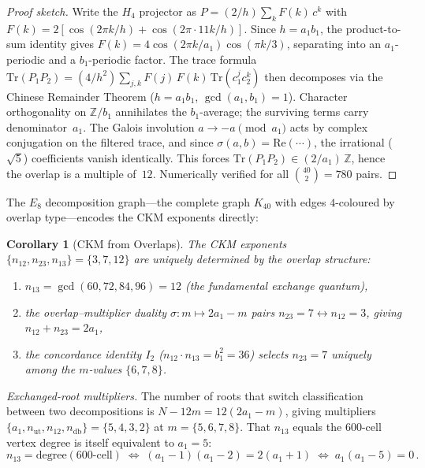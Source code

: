 \documentclass[12pt,a4paper]{article}
\newtheorem{corollary}{Corollary}
\theoremstyle{definition}
\begin{document}
\begin{proof}[Proof sketch]
Write the $H_4$ projector as $P = (2/h)\sum_k F(k)\,c^k$ with $F(k) = 2[\cos(2\pi k/h) + \cos(2\pi\cdot 11k/h)]$.  Since $h = a_1 b_1$, the product-to-sum identity gives $F(k) = 4\cos(2\pi k/a_1)\cos(\pi k/3)$, separating into an $a_1$-periodic and a $b_1$-periodic factor.  The trace formula $\mathrm{Tr}(P_1 P_2) = (4/h^2)\sum_{j,k} F(j)\,F(k)\,\mathrm{Tr}(c_1^j c_2^k)$ then decomposes via the Chinese Remainder Theorem ($h = a_1 b_1$, $\gcd(a_1,b_1) = 1$).  Character orthogonality on $\mathbb{Z}/b_1$ annihilates the $b_1$-average; the surviving terms carry denominator~$a_1$.  The Galois involution $a \to -a\!\pmod{a_1}$ acts by complex conjugation on the filtered trace, and since $\sigma(a,b) = \mathrm{Re}(\cdots)$, the irrational ($\sqrt{5}$) coefficients vanish identically.  This forces $\mathrm{Tr}(P_1 P_2) \in (2/a_1)\,\mathbb{Z}$, hence the overlap is a multiple of~$12$.  Numerically verified for all $\binom{40}{2} = 780$ pairs.
\end{proof}

\noindent The $E_8$ decomposition graph---the complete graph $K_{40}$ with edges $4$-coloured by overlap type---encodes the CKM exponents directly:

\begin{corollary}[CKM from Overlaps]
\label{cor:ckm_overlap}
The CKM exponents $\{n_{12}, n_{23}, n_{13}\} = \{3, 7, 12\}$ are uniquely determined by the overlap structure:
\begin{enumerate}
\item $n_{13} = \gcd(60, 72, 84, 96) = 12$ (the fundamental exchange quantum),
\item the overlap--multiplier duality $\sigma\colon m \mapsto 2a_1 - m$ pairs $n_{23} = 7 \leftrightarrow n_{12} = 3$, giving $n_{12} + n_{23} = 2a_1$,
\item the concordance identity $I_2$ ($n_{12} \cdot n_{13} = b_1^2 = 36$) selects $n_{23} = 7$ uniquely among the $m$-values $\{6, 7, 8\}$.
\end{enumerate}
\end{corollary}

\noindent\textit{Exchanged-root multipliers.}  The number of roots that switch classification between two decompositions is $N - 12m = 12(2a_1 - m)$, giving multipliers $\{a_1, n_{\mathrm{ut}}, n_{12}, n_{\mathrm{db}}\} = \{5, 4, 3, 2\}$ at $m = \{5, 6, 7, 8\}$.  That $n_{13}$ equals the 600-cell vertex degree is itself equivalent to $a_1 = 5$:
\begin{equation}
n_{13} = \mathrm{degree}(600\text{-cell}) \;\Longleftrightarrow\; (a_1-1)(a_1-2) = 2(a_1+1) \;\Longleftrightarrow\; a_1(a_1-5) = 0\,.
\label{eq:n13_degree}
\end{equation}
\end{document}
